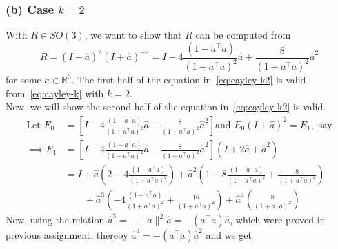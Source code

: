 \subsubsection*{(b) Case \( k=2 \)}

With \( R \in SO(3) \), we want to show that \( R \) can be computed from
\begin{equation}\label{eq:cayley-k2}
    R
    =
    {(I - \widehat{a})}^{2} {(I + \widehat{a})}^{-2}
    =
    I - 4 \frac{(1 - a^{\top} a)}{{(1 + a^{\top} a)}^{2}} \widehat{a} + \frac{8}{{(1 + a^{\top} a)}^{2}} \widehat{a}^{2}
\end{equation}
for some \( a \in \mathbb{R}^{3} \).
The first half of the equation in~\eqref{eq:cayley-k2} is valid from~\eqref{eq:cayley-k} with \( k = 2 \). \\
Now, we will show the second half of the equation in~\eqref{eq:cayley-k2} is valid.
\begin{align*}
    \text{Let }
    E_0
     & =
    \left[
        I
        - 4 \frac{(1 - a^{\top} a)}{{(1 + a^{\top} a)}^{2}} \widehat{a}
        + \frac{8}{{(1 + a^{\top} a)}^{2}} \widehat{a}^{2}
        \right]
    \text{and }
    E_0
    {(I + \widehat{a})}^{2}
    =
    E_1
    , \text{ say}
    \\
    \implies
    E_1
     & =
    \left[
        I
        - 4 \frac{(1 - a^{\top} a)}{{(1 + a^{\top} a)}^{2}} \widehat{a}
        + \frac{8}{{(1 + a^{\top} a)}^{2}} \widehat{a}^{2}
        \right]
    (I + 2 \widehat{a} + \widehat{a}^{2})
    \\ & =
    I
    + \widehat{a} \left( 2 - 4 \frac{(1 - a^{\top} a)}{{(1 + a^{\top} a)}^{2}} \right)
    + \widehat{a}^{2} \left( 1 - 8 \frac{(1 - a^{\top} a)}{{(1 + a^{\top} a)}^{2}} + \frac{8}{{(1 + a^{\top} a)}^{2}} \right)
    \\ & \qquad
    + \widehat{a}^{3} \left( -4 \frac{(1 - a^{\top} a)}{{(1 + a^{\top} a)}^{2}} + \frac{16}{{(1 + a^{\top} a)}^{2}} \right)
    + \widehat{a}^{4} \left( \frac{8}{{(1 + a^{\top} a)}^{2}} \right)
\end{align*}
Now, using the relation \( \widehat{a}^{3} = - \| a \|^{2} \widehat{a} = - (a^{\top} a) \widehat{a} \), which were proved in previous assignment, thereby \( \widehat{a}^{4} = - (a^{\top} a) \widehat{a}^{2} \) and we get
